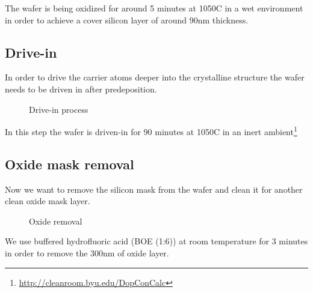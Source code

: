 The wafer is being oxidized for around 5 minutes at 1050\degree C in a wet environment in order to achieve a cover silicon layer of around 90nm thickness.

\subsection{Drive-in}
In order to drive the carrier atoms deeper into the crystalline structure the wafer needs to be driven in after predeposition.

\begin{figure}[H]
	\centering
	\begin{tikzpicture}[node distance = 3cm, auto, thick,scale=\CrossSectionOnly, every node/.style={transform shape}]
		
	\end{tikzpicture}
	\drawStepArrow{}
	\begin{tikzpicture}[node distance = 3cm, auto, thick,scale=\CrossSectionOnly, every node/.style={transform shape}]
		
	\end{tikzpicture}
	\caption{Drive-in process}
\end{figure}

In this step the wafer is  driven-in for 90 minutes at 1050\degree C in an inert ambient\footnote{\url{http://cleanroom.byu.edu/DopConCalc}}

\subsection{Oxide mask removal}

Now we want to remove the silicon mask from the wafer and clean it for another clean oxide mask layer.

\begin{figure}[H]
	\centering
	\begin{tikzpicture}[node distance = 3cm, auto, thick,scale=\CrossSectionOnly, every node/.style={transform shape}]
		
	\end{tikzpicture}
	\drawStepArrow{}
	\begin{tikzpicture}[node distance = 3cm, auto, thick,scale=\CrossSectionOnly, every node/.style={transform shape}]
		
	\end{tikzpicture}
	\caption{Oxide removal}
\end{figure}

We use buffered hydrofluoric acid (BOE (1:6)) at room temperature for 3 minutes in order to remove the 300nm of oxide layer.
